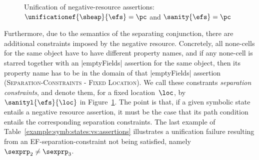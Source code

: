 \begin{figure}[!t]
{\scriptsize
{}}
\vspace*{-0.6cm}
\caption{Unification of negative-resource assertions: $\unificationef{\sheap}{\efs} = \pc$ and $\sanity{\efs} = \pc$}
\label{fig:unineg}
\vspace*{-0.2cm}
\end{figure}

Furthermore, due to the semantics of the separating conjunction, there are additional  constraints imposed by the negative resource. Concretely, all none-cells for the same object have to have different property names, and if any none-cell is starred together with an \jsinline|emptyFields| assertion for the same object, then its property name has to be in the domain of that \jsinline|emptyFields| assertion (\textsc{Separation-Constraints - Fixed Location}). 
We call these constrants \emph{separation constraints}, and denote them, for a fixed location~$\loc$, by $\sanityl{\efs}{\loc}$ in Figure~\ref{fig:unineg}. The point is that, if a given symbolic state entails a negative resource assertion, it must be the case that its path condition entails the corresponding separation constraints.
The last example of Table~\ref{example:symb:states:vs:assertions} illustrates a unification failure resulting from an EF-separation-constraint not being satisfied,
namely $\sexprp_2 \neq \sexprp_3$. 

